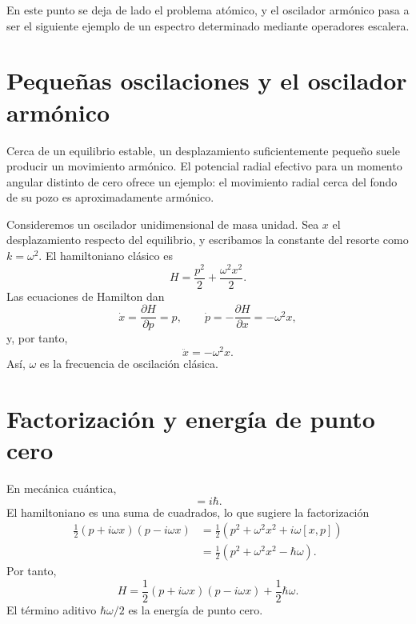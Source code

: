\begin{classroomqa}
\end{classroomqa}

En este punto se deja de lado el problema atómico, y el oscilador armónico pasa a ser el siguiente ejemplo de un espectro determinado mediante operadores escalera.

\section{Pequeñas oscilaciones y el oscilador armónico}

Cerca de un equilibrio estable, un desplazamiento suficientemente pequeño suele producir un movimiento armónico. El potencial radial efectivo para un momento angular distinto de cero ofrece un ejemplo: el movimiento radial cerca del fondo de su pozo es aproximadamente armónico.

Consideremos un oscilador unidimensional de masa unidad. Sea \(x\) el desplazamiento respecto del equilibrio, y escribamos la constante del resorte como \(k=\omega^2\). El hamiltoniano clásico es
\begin{equation}
H=\frac{p^2}{2}+\frac{\omega^2x^2}{2}.
\end{equation}
Las ecuaciones de Hamilton dan
\begin{equation}
\dot{x}=\frac{\partial H}{\partial p}=p,
\qquad
\dot{p}=-\frac{\partial H}{\partial x}=-\omega^2x,
\end{equation}
y, por tanto,
\begin{equation}
\ddot{x}=-\omega^2x.
\end{equation}
Así, \(\omega\) es la frecuencia de oscilación clásica.

\section{Factorización y energía de punto cero}

En mecánica cuántica,
\begin{equation}
[x,p]=i\hbar.
\end{equation}
El hamiltoniano es una suma de cuadrados, lo que sugiere la factorización
\begin{align}
\frac{1}{2}(p+i\omega x)(p-i\omega x)
&=\frac{1}{2}\left(p^2+\omega^2x^2+i\omega[x,p]\right) \\
&=\frac{1}{2}\left(p^2+\omega^2x^2-\hbar\omega\right).
\end{align}
Por tanto,
\begin{equation}
H=\frac{1}{2}(p+i\omega x)(p-i\omega x)
+\frac{1}{2}\hbar\omega.
\end{equation}
El término aditivo \(\hbar\omega/2\) es la energía de punto cero.

